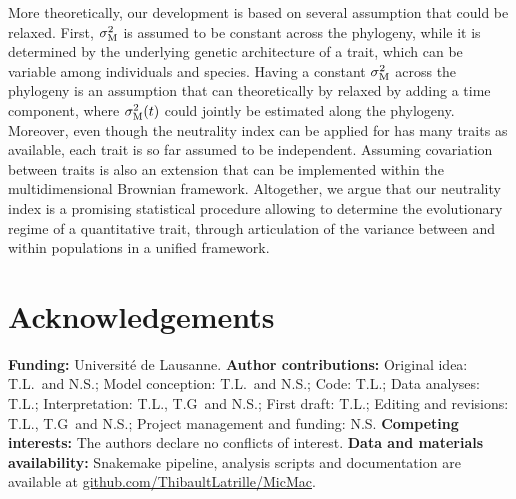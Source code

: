 \documentclass{article}
\begin{document}
More theoretically, our development is based on several assumption that could be relaxed.
First, $\sigma^2_{\text{M}}$ is assumed to be constant across the phylogeny, while it is determined by the underlying genetic architecture of a trait, which can be variable among individuals and species.
Having a constant $\sigma^2_{\text{M}}$ across the phylogeny is an assumption that can theoretically by relaxed by adding a time component\cite{arnold_understanding_2008, hohenlohe_mipod_2008}, where $\sigma^2_{\text{M}}(t)$ could jointly be estimated along the phylogeny\cite{kostikova_bridging_2016, gaboriau_multiplatform_2020}.
Moreover, even though the neutrality index can be applied for has many traits as available, each trait is so far assumed to be independent.
Assuming covariation between traits is also an extension that can be implemented within the multidimensional Brownian framework\cite{huelsenbeck_detecting_2003,  lartillot_phylogenetic_2011,lartillot_joint_2012}.
Altogether, we argue that our neutrality index is a promising statistical procedure allowing to determine the evolutionary regime of a quantitative trait, through articulation of the variance between and within populations in a unified framework.

\section*{Acknowledgements}
\label{sec:acknowledgment}
\textbf{Funding:}
Université de Lausanne.
\textbf{Author contributions:}
Original idea: T.L.\ and N.S.;
Model conception: T.L.\ and N.S.;
Code: T.L.;
Data analyses: T.L.;
Interpretation: T.L., T.G\ and N.S.;
First draft: T.L.;
Editing and revisions: T.L., T.G\ and N.S.;
Project management and funding: N.S\@.
\textbf{Competing interests:}
The authors declare no conflicts of interest.
\textbf{Data and materials availability:}
Snakemake pipeline, analysis scripts and documentation are available at \href{https://github.com/ThibaultLatrille/MicMac}{github.com/ThibaultLatrille/MicMac}.

\printbibliography
\end{document}
